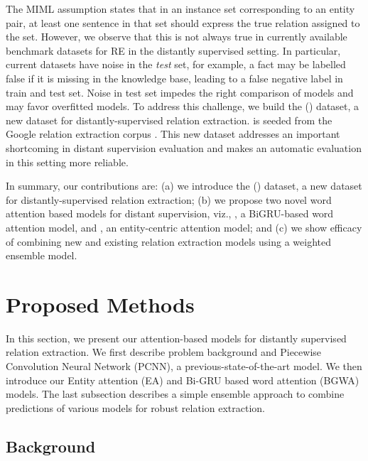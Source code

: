 \documentclass{article}
\begin{document}
The MIML assumption states that in an instance set corresponding to an entity pair, at least one sentence in that set should express the true relation assigned to the set. However, we observe that this is not always true in currently available benchmark datasets for RE in the distantly supervised setting. In particular, current datasets have noise in the \emph{test} set, for example, a fact may be labelled false if it is missing in the knowledge base, leading to a false negative label in train and test set. Noise in test set impedes the right comparison of models and may favor overfitted models. To address this challenge, we build the \newdataset{} (\newdatasetshort{}) dataset, a new dataset for distantly-supervised relation extraction. \newdatasetshort{} is seeded from the Google relation extraction corpus \cite{g:dataset}. This new dataset addresses an important shortcoming in distant supervision evaluation and makes an automatic evaluation in this setting more reliable. 

In summary, our contributions are: (a) we introduce the \newdataset{} (\newdatasetshort{}) dataset, a new dataset for distantly-supervised relation extraction; (b) we propose two novel word attention based models for distant supervision, viz., \systemwa{}, a BiGRU-based word attention model, and \systemea{}, an entity-centric attention model; and (c) we show efficacy of combining new and existing relation extraction models using a weighted ensemble model. 

 
\section{Proposed Methods}
\label{sec:proposed_methods}



In this section, we present our attention-based models for distantly supervised relation extraction. We first describe problem background and Piecewise Convolution Neural Network (PCNN), a previous-state-of-the-art model. We then introduce our Entity attention (EA) and Bi-GRU based word attention (BGWA) models. The last subsection describes a simple ensemble approach to combine predictions of various models for robust relation extraction.  




\subsection{Background}
\label{sec:background}
\end{document}
